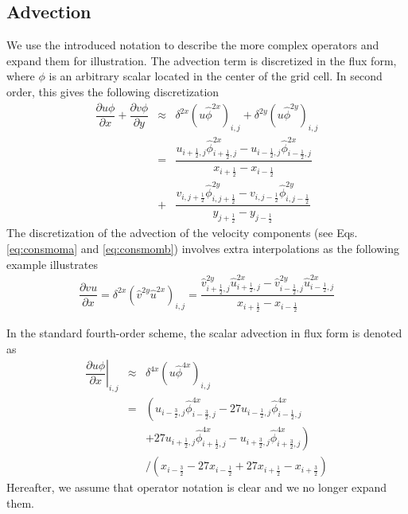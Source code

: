 \documentclass[gmd]{copernicus}
\begin{document}
\subsection{Advection}
We use the introduced notation to describe the more complex operators and expand them for illustration. The advection term is discretized in the flux form, where $\phi$ is an arbitrary scalar located in the center of the grid cell. In second order, this gives the following discretization
\begin{eqnarray}
\nonumber
\dfrac{\partial u \phi}{\partial x} + \dfrac{\partial v \phi}{\partial y} & \approx & 
\delta^{2x} \left( u \widehat{\phi}^{2x} \right)_{i,j} + \delta^{2y} \left( u \widehat{\phi}^{2y} \right)_{i,j} \\ 
& = & \dfrac{ u_{i+\frac{1}{2},j} \widehat{\phi}^{2x}_{i+\frac{1}{2},j} - u_{i-\frac{1}{2},j} \widehat{\phi}^{2x}_{i-\frac{1}{2},j} }
            { x_{i+\frac{1}{2}} - x_{i-\frac{1}{2}} }\\
& + & \dfrac{ v_{i,j+\frac{1}{2}} \widehat{\phi}^{2y}_{i,j+\frac{1}{2}} - v_{i,j-\frac{1}{2}} \widehat{\phi}^{2y}_{i,j-\frac{1}{2}} }
            { y_{j+\frac{1}{2}} - y_{j-\frac{1}{2}} }
\end{eqnarray}
The discretization of the advection of the velocity components (see Eqs. \ref{eq:consmoma} and \ref{eq:consmomb}) involves extra interpolations as the following example illustrates
\begin{eqnarray}
\dfrac{\partial v u}{\partial x} = \delta^{2x} \left( \widehat{v}^{2y} \widehat{u}^{2x} \right)_{i,j} =
\dfrac{ \widehat{v}^{2y}_{i+\frac{1}{2},j} \widehat{u}^{2x}_{i+\frac{1}{2},j} - \widehat{v}^{2y}_{i-\frac{1}{2},j} \widehat{u}^{2x}_{i-\frac{1}{2},j} }
      { x_{i+\frac{1}{2}} - x_{i-\frac{1}{2}} }\label{eq:advec2u}
\end{eqnarray}

In the standard fourth-order scheme, the scalar advection in flux form is denoted as
\begin{eqnarray}
\nonumber
\left. \dfrac{\partial u \phi}{\partial x} \right|_{i,j} & \approx & \delta^{4x} \left( u \widehat{\phi}^{4x} \right)_{i,j} \\
\nonumber
& = & \left( u_{i-\frac{3}{2},j} \widehat{\phi}^{4x}_{i-\frac{3}{2},j} - 27 u_{i-\frac{1}{2},j} \widehat{\phi}^{4x}_{i-\frac{1}{2},j} \right.\\
\nonumber
&   &\left. + 27 u_{i+\frac{1}{2},j} \widehat{\phi}^{4x}_{i+\frac{1}{2},j} - u_{i+\frac{3}{2},j} \widehat{\phi}^{4x}_{i+\frac{3}{2},j} \right)\\
&   &\slash \left( x_{i-\frac{3}{2}} - 27 x_{i-\frac{1}{2}} + 27 x_{i+\frac{1}{2}} - x_{i+\frac{3}{2}} \right)
\end{eqnarray}
Hereafter, we assume that operator notation is clear and we no longer expand them.
\end{document}
